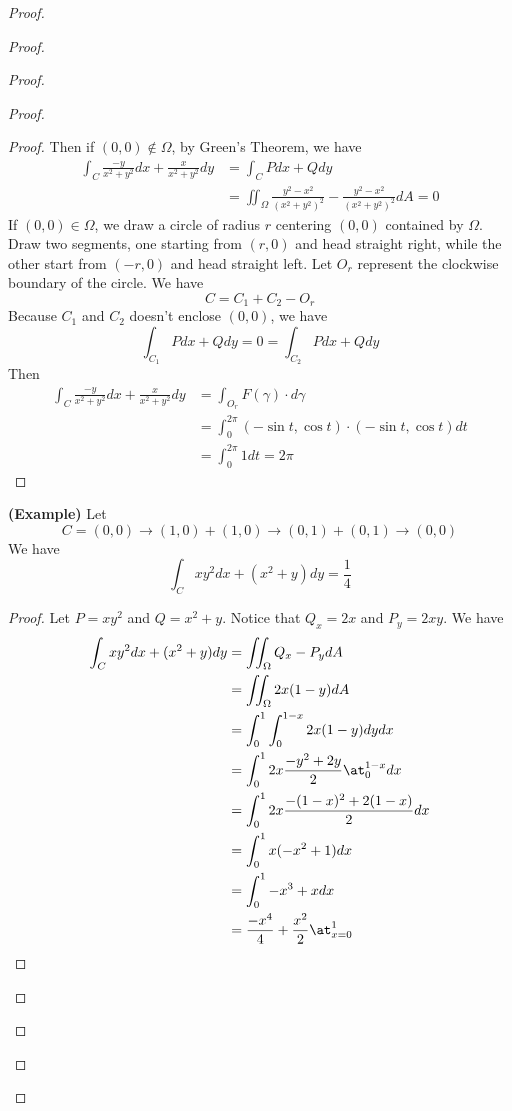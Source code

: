 \documentclass{report}
\begin{document}
\begin{proof}
\begin{proof}
\begin{proof}
\begin{proof}
\begin{proof}
Then if $(0,0)\not\in \Omega$, by Green's Theorem, we have
\begin{align*}
\int_C \frac{-y}{x^2+y^2}dx+\frac{x}{x^2+y^2}dy&=\int_C Pdx+Qdy\\
&=\iint_{\Omega} \frac{y^2-x^2}{(x^2+y^2)^2}-\frac{y^2-x^2}{(x^2+y^2)^2} dA=0
\end{align*}
If $(0,0)\in \Omega$, we  draw a circle of radius $r$ centering $(0,0)$ contained by $\Omega$. Draw two segments, one starting from $(r,0)$ and head straight right, while the other start from $(-r,0)$ and head straight left. Let  $O_r$ represent the clockwise boundary of the circle. We have
 \begin{equation*}
C=C_1+C_2-O_r
\end{equation*}
Because $C_1$ and  $C_2$ doesn't enclose  $(0,0)$, we have
\begin{equation*}
\int_{C_1} Pdx+Qdy=0=\int_{C_2}Pdx+Qdy
\end{equation*}
Then
\begin{align*}
\int_C \frac{-y}{x^2+y^2}dx+\frac{x}{x^2+y^2}dy&=\int_{O_r} F(\gamma )\cdot d\gamma\\
&=\int_0^{2\pi} (-\sin t,\cos t)\cdot (-\sin t,\cos t)dt\\
&=\int_0^{2\pi} 1dt=2\pi
\end{align*}
\end{proof}
\begin{theorem}
\label{9.3.12}
\textbf{(Example)} Let
\begin{equation*}
C=(0,0)\to (1,0)+(1,0)\to (0,1)+(0,1)\to (0,0)
\end{equation*}
We have
\begin{equation*}
\int_{C}xy^2dx+(x^2+y)dy=\frac{1}{4}
\end{equation*}
\end{theorem}
\begin{proof}
Let $P=xy^2$ and $Q=x^2+y$. Notice that $Q_x=2x$ and  $P_y=2xy$. We have
\begin{align*}
\int_C xy^2dx+(x^2+y)dy&=\iint_{\Omega} Q_x-P_ydA\\
&=\iint_\Omega 2x(1-y)dA\\
&=\int_0^1\int_0^{1-x} 2x(1-y)dydx\\
&=\int_0^12x \frac{-y^2+2y}{2}\at_{0}^{1-x}dx\\
&=\int_0^1 2x \frac{-(1-x)^2+2(1-x)}{2}dx\\
&=\int_0^1 x(-x^2+1)dx\\
&=\int_0^1 -x^3+xdx\\
&=\frac{-x^4}{4}+\frac{x^2}{2}\at_{x=0}^1\\

\end{align*}
\end{proof}
\end{proof}
\end{proof}
\end{proof}
\end{proof}
\end{document}

